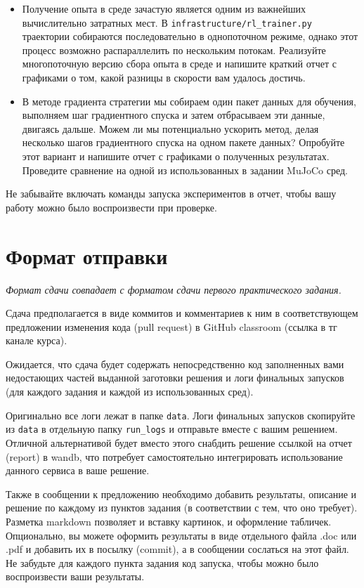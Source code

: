 \documentclass[12pt, oneside]{article}
\begin{document}
\begin{itemize}
    \item Получение опыта в среде зачастую является одним из важнейших вычислительно затратных мест. В \verb|infrastructure/rl_trainer.py| траектории собираются последовательно в однопоточном режиме, однако этот процесс возможно распараллелить по нескольким потокам. Реализуйте многопоточную версию сбора опыта в среде и напишите краткий отчет с графиками о том, какой разницы в скорости вам удалось достичь.
    \item В методе градиента стратегии мы собираем один пакет данных для обучения, выполняем шаг градиентного спуска и затем отбрасываем эти данные, двигаясь дальше. Можем ли мы потенциально ускорить метод, делая несколько шагов градиентного спуска на одном пакете данных? Опробуйте этот вариант и напишите отчет с графиками о полученных результатах. Проведите сравнение на одной из использованных в задании MuJoCo сред.
\end{itemize}

Не забывайте включать команды запуска экспериментов в отчет, чтобы вашу работу можно было воспроизвести при проверке.

\section{Формат отправки}

\textit{Формат сдачи совпадает с форматом сдачи первого практического задания.}

Сдача предполагается в виде коммитов и комментариев к ним в соответствующем предложении изменения кода (pull request) в GitHub classroom (ссылка в тг канале курса).

Ожидается, что сдача будет содержать непосредственно код заполненных вами недостающих частей выданной заготовки решения и логи финальных запусков (для каждого задания и каждой из использованных сред).

Оригинально все логи лежат в папке \verb|data|. Логи финальных запусков скопируйте из \verb|data| в отдельную папку \verb|run_logs| и отправьте вместе с вашим решением. Отличной альтернативой будет вместо этого снабдить решение ссылкой на отчет (report) в wandb, что потребует самостоятельно интегрировать использование данного сервиса в ваше решение.

Также в сообщении к предложению необходимо добавить результаты, описание и решение по каждому из пунктов задания (в соответствии с тем, что оно требует). Разметка markdown позволяет и вставку картинок, и оформление табличек. Опционально, вы можете оформить результаты в виде отдельного файла .doc или .pdf и добавить их в посылку (commit), а в сообщении сослаться на этот файл. Не забудьте для каждого пункта задания код запуска, чтобы можно было воспроизвести ваши результаты.
\end{document}
